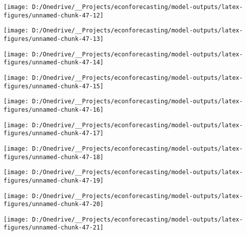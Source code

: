 \documentclass[11pt, letterpaper]{article}\usepackage[]{graphicx}\usepackage[]{color}
\begin{document}
{\centering \texttt{[image: D:/Onedrive/\_\_Projects/econforecasting/model-outputs/latex-figures/unnamed-chunk-47-12]} 

}




{\centering \texttt{[image: D:/Onedrive/\_\_Projects/econforecasting/model-outputs/latex-figures/unnamed-chunk-47-13]} 

}




{\centering \texttt{[image: D:/Onedrive/\_\_Projects/econforecasting/model-outputs/latex-figures/unnamed-chunk-47-14]} 

}




{\centering \texttt{[image: D:/Onedrive/\_\_Projects/econforecasting/model-outputs/latex-figures/unnamed-chunk-47-15]} 

}




{\centering \texttt{[image: D:/Onedrive/\_\_Projects/econforecasting/model-outputs/latex-figures/unnamed-chunk-47-16]} 

}




{\centering \texttt{[image: D:/Onedrive/\_\_Projects/econforecasting/model-outputs/latex-figures/unnamed-chunk-47-17]} 

}




{\centering \texttt{[image: D:/Onedrive/\_\_Projects/econforecasting/model-outputs/latex-figures/unnamed-chunk-47-18]} 

}




{\centering \texttt{[image: D:/Onedrive/\_\_Projects/econforecasting/model-outputs/latex-figures/unnamed-chunk-47-19]} 

}




{\centering \texttt{[image: D:/Onedrive/\_\_Projects/econforecasting/model-outputs/latex-figures/unnamed-chunk-47-20]} 

}




{\centering \texttt{[image: D:/Onedrive/\_\_Projects/econforecasting/model-outputs/latex-figures/unnamed-chunk-47-21]} 

}
\end{document}
